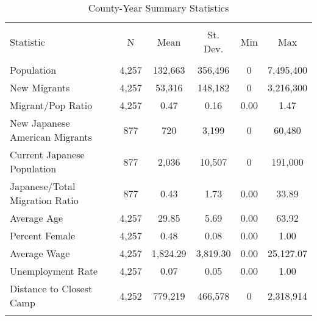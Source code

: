 
\begin{table}[H] \centering 
  \caption{County-Year Summary Statistics} 
  \label{ctysumstats} 
\begin{tabular}{@{\extracolsep{5pt}}lccccc} 
\\[-1.8ex]\hline 
\hline \\[-1.8ex] 
Statistic & \multicolumn{1}{c}{N} & \multicolumn{1}{c}{Mean} & \multicolumn{1}{c}{St. Dev.} & \multicolumn{1}{c}{Min} & \multicolumn{1}{c}{Max} \\ 
\hline \\[-1.8ex] 
Population & 4,257 & 132,663 & 356,496 & 0 & 7,495,400 \\ 
New Migrants & 4,257 & 53,316 & 148,182 & 0 & 3,216,300 \\ 
Migrant/Pop Ratio & 4,257 & 0.47 & 0.16 & 0.00 & 1.47 \\ 
New Japanese American Migrants & 877 & 720 & 3,199 & 0 & 60,480 \\ 
Current Japanese Population & 877 & 2,036 & 10,507 & 0 & 191,000 \\ 
Japanese/Total Migration Ratio & 877 & 0.43 & 1.73 & 0.00 & 33.89 \\ 
Average Age & 4,257 & 29.85 & 5.69 & 0.00 & 63.92 \\ 
Percent Female & 4,257 & 0.48 & 0.08 & 0.00 & 1.00 \\ 
Average Wage & 4,257 & 1,824.29 & 3,819.30 & 0.00 & 25,127.07 \\ 
Unemployment Rate & 4,257 & 0.07 & 0.05 & 0.00 & 1.00 \\ 
Distance to Closest Camp & 4,252 & 779,219 & 466,578 & 0 & 2,318,914\\ 
\hline \\[-1.8ex] 
\end{tabular} 
\end{table} 
